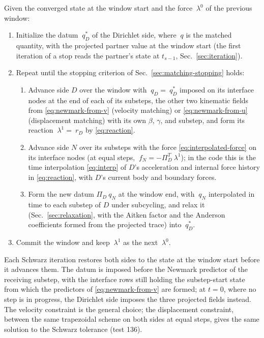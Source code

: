 \documentclass[11pt]{article}
\begin{document}
Given the converged state at the window start and the force $~\lambda^0$ of
the previous window:
\begin{enumerate}[itemsep=2pt]
\item Initialize the datum $~q_D^\ast$ of the Dirichlet side, where $~q$
  is the matched quantity, with the projected partner value at the window
  start (the first iteration of a stop reads the partner's state at
  $t_{s-1}$, Sec.~\ref{sec:iteration}).
\item Repeat until the stopping criterion of
  Sec.~\ref{sec:matching-stopping} holds:
  \begin{enumerate}[itemsep=1pt]
  \item Advance side $D$ over the window with $~q_D = ~q_D^\ast$ imposed on
    its interface nodes at the end of each of its substeps, the other two
    kinematic fields from \eqref{eq:newmark-from-v} (velocity matching) or
    \eqref{eq:newmark-from-u} (displacement matching) with its own
    $\beta$, $\gamma$, and substep, and form its reaction
    $~\lambda^1 = ~r_D$ by \eqref{eq:reaction}.
  \item Advance side $N$ over its substeps with the force
    \eqref{eq:interpolated-force} on its interface nodes (at equal steps,
    $~f_N = -\Pi_D^T ~\lambda^1$); in the code this is the time
    interpolation \eqref{eq:interp} of $D$'s acceleration and internal
    force history in \eqref{eq:reaction}, with $D$'s current body and
    boundary forces.
  \item Form the new datum $\Pi_D ~q_N$ at the window end, with $~q_N$
    interpolated in time to each substep of $D$ under subcycling, and relax
    it (Sec.~\ref{sec:relaxation}, with the Aitken factor and the Anderson
    coefficients formed from the projected trace) into $~q_D^\ast$.
  \end{enumerate}
\item Commit the window and keep $~\lambda^1$ as the next $~\lambda^0$.
\end{enumerate}
Each Schwarz iteration restores both sides to the state at the window
start before it advances them. The datum is imposed before the Newmark
predictor of the receiving substep, with the interface rows still holding
the substep-start state from which the predictors of
\eqref{eq:newmark-from-v} are formed; at $t = 0$, where no step is in
progress, the Dirichlet side imposes the three projected fields instead.
The velocity constraint is the general choice; the displacement
constraint, between the same trapezoidal scheme on both sides at equal
steps, gives the same solution to the Schwarz tolerance (test 136).
\end{document}
